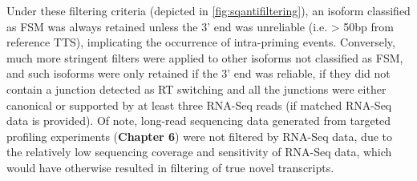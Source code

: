 Under these filtering criteria (depicted in \cref{fig:sqantifiltering}), an isoform classified as FSM was always retained unless the 3' end was unreliable (i.e. > 50bp from reference TTS), implicating the occurrence of intra-priming events. Conversely, much more stringent filters were applied to other isoforms not classified as FSM, and such isoforms were only retained if the 3' end was reliable, if they did not contain a junction detected as RT switching and all the junctions were either canonical or supported by at least three RNA-Seq reads (if matched RNA-Seq data is provided). Of note, long-read sequencing data generated from targeted profiling experiments (\textbf{Chapter 6}) were not filtered by RNA-Seq data, due to the relatively low sequencing coverage and sensitivity of RNA-Seq data, which would have otherwise resulted in filtering of true novel transcripts. 

